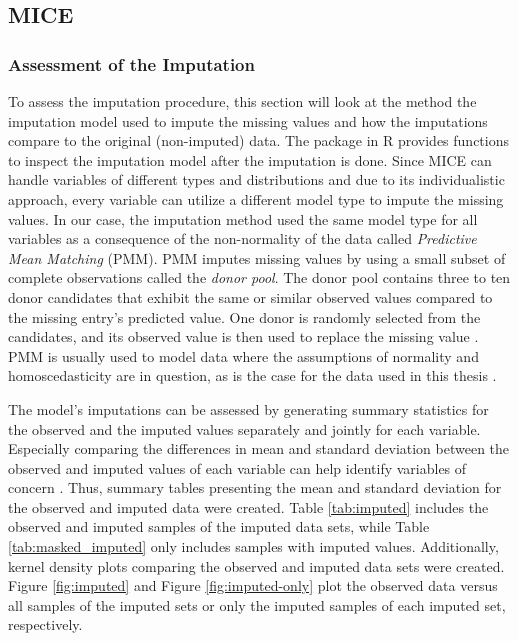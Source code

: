 \subsection{MICE}
\subsubsection{Assessment of the Imputation}
To assess the imputation procedure, this section will look at the 
method the imputation model used to impute the missing values and how the 
imputations compare to the original (non-imputed) data. The  
package in R provides functions to inspect the imputation model after the 
imputation is done. Since MICE can handle variables of different types and 
distributions and due to its individualistic approach, every variable can 
utilize a different model type to impute the missing values. In our case, the 
imputation method used the same model type for all variables as a consequence 
of the non-normality of the data called \textit{Predictive Mean Matching} (PMM).
PMM imputes missing values by using a small subset of complete observations 
called the \textit{donor pool}. The donor pool contains three to ten donor 
candidates 
that exhibit the same or similar observed values compared to the missing 
entry's predicted value. One donor is randomly selected from the candidates, 
and its observed value is then used to replace the missing value 
\cite{RN144, RN145, RN146}. PMM is usually used to model data where the 
assumptions of normality and homoscedasticity are in question, as is the case 
for the data used in this thesis \cite{RN146}.
\par
The model's imputations can be assessed by generating summary statistics for the
observed and the imputed values separately and jointly for each variable. 
Especially comparing the differences in mean and standard deviation between the 
observed and imputed values of each variable can help identify variables of 
concern \cite{RN141}. Thus, summary tables presenting the mean and standard 
deviation for the observed and imputed data were created. Table 
\ref{tab:imputed} includes the observed and imputed samples of the imputed 
data sets, while Table \ref{tab:masked_imputed} only includes samples with 
imputed values. Additionally, kernel density plots comparing the observed and 
imputed data sets were created. Figure \ref{fig:imputed} and Figure 
\ref{fig:imputed-only} plot the observed data versus all samples of the imputed 
sets or only the imputed samples of each imputed set, respectively.
\\

